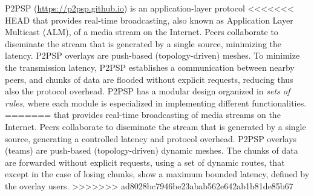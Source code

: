 P2PSP (\url{https://p2psp.github.io}) is an application-layer protocol
<<<<<<< HEAD
that provides real-time broadcasting, also known as Application Layer
Multicast (ALM), of a media stream on the Internet. Peers collaborate
to diseminate the stream that is generated by a single source,
minimizing the latency. P2PSP overlays are push-based
(topology-driven) meshes. To minimize the transmission latency, P2PSP
establishes a communication between nearby peers, and chunks of data
are flooded without explicit requests, reducing thus also the protocol
overhead. P2PSP has a modular design organized in \emph{sets of
rules}, where each module is especialized in implementing different
functionalities.
=======
that provides real-time broadcasting of media streams on the
Internet. Peers collaborate to diseminate the stream that is generated
by a single source, generating a controlled latency and protocol
overhead. P2PSP overlays (teams) are push-based (topology-driven)
dynamic meshes. The chunks of data are forwarded without explicit
requests, using a set of dynamic routes, that except in the case of
losing chunks, show a maximum bounded latency, defined by the overlay
users.
>>>>>>> ad8028bc7946be23abab562e642ab1b81de85b67
